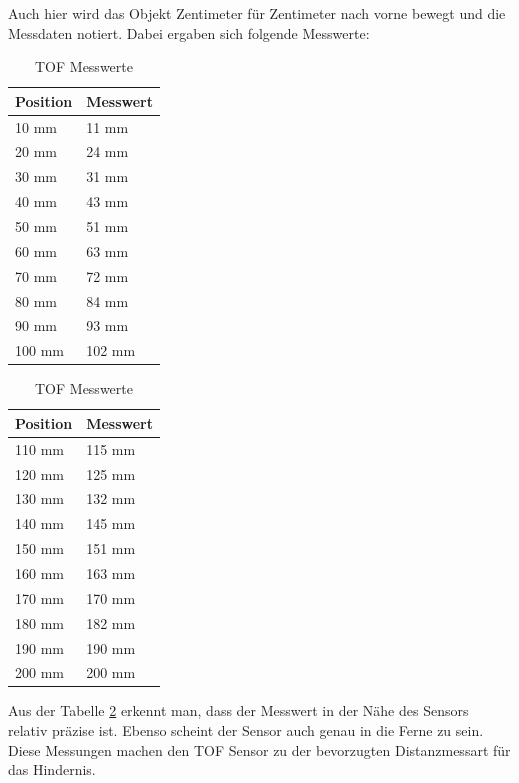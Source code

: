 Auch hier wird das Objekt Zentimeter für Zentimeter nach vorne bewegt und die Messdaten notiert. Dabei ergaben sich folgende Messwerte:
\begin{table}[H]
\centering
\begin{minipage}{0.45\textwidth}
\centering
\begin{tabular}{@{}ll@{}}
\toprule
\textbf{Position} & \textbf{Messwert} \\
\midrule
10 mm  & 11 mm  \\
20 mm  & 24 mm  \\
30 mm  & 31 mm  \\
40 mm  & 43 mm  \\
50 mm  & 51 mm  \\
60 mm  & 63 mm  \\
70 mm  & 72 mm  \\
80 mm  & 84 mm  \\
90 mm  & 93 mm  \\
100 mm & 102 mm \\
\bottomrule
\end{tabular}
\end{minipage}%
\hspace{0.05\textwidth} %
\begin{minipage}{0.45\textwidth}
\centering
\begin{tabular}{@{}ll@{}}
\toprule
\textbf{Position} & \textbf{Messwert} \\
\midrule
110 mm & 115 mm \\
120 mm & 125 mm \\
130 mm & 132 mm \\
140 mm & 145 mm \\
150 mm & 151 mm \\
160 mm & 163 mm \\
170 mm & 170 mm \\
180 mm & 182 mm \\
190 mm & 190 mm \\
200 mm & 200 mm \\
\bottomrule
\end{tabular}
\end{minipage}
\caption{TOF Messwerte}
\label{tab:TOFMD}
\end{table}

Aus der Tabelle \ref{tab:TOFMD} erkennt man, dass der Messwert in der Nähe des Sensors relativ präzise ist. Ebenso scheint der Sensor auch genau in die Ferne zu sein. Diese Messungen machen den TOF Sensor zu der bevorzugten Distanzmessart für das Hindernis.


